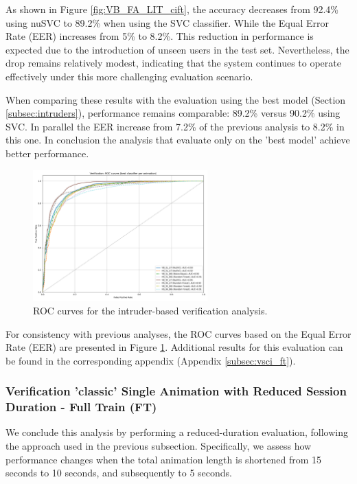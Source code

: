 \documentclass{article}
\begin{document}
As shown in Figure \ref{fig:VB_FA_LIT_cift}, the accuracy decreases from 92.4\% using nuSVC to 89.2\% when using the SVC classifier.
While the Equal Error Rate (EER) increases from 5\% to 8.2\%. 
This reduction in performance is expected due to the introduction of unseen users in the test set. 
Nevertheless, the drop remains relatively modest, indicating that the system continues to operate effectively under this more challenging evaluation scenario.

When comparing these results with the evaluation using the best model (Section \ref{subsec:intruders}), performance remains comparable: 89.2\% versus 90.2\% using SVC. 
In parallel the EER increase from 7.2\% of the previous analysis to 8.2\% in this one.
In conclusion the analysis that evaluate only on the 'best model' achieve better performance.

\begin{figure}[ht]
\centering
\includegraphics[width=0.6\textwidth]{Images/Results/Classic_procedure/Verification_intruders/ft/Verification_single_intruders_roc_two_ft.png}
\caption{ROC curves for the intruder-based verification analysis.}
\label{fig:roc_cift}
\end{figure}

For consistency with previous analyses, the ROC curves based on the Equal Error Rate (EER) are presented in Figure \ref{fig:roc_cift}. 
Additional results for this evaluation can be found in the corresponding appendix (Appendix \ref{subsec:vsci_ft}).
\FloatBarrier

\subsubsection{Verification 'classic' Single Animation with Reduced Session Duration - Full Train (FT)}

We conclude this analysis by performing a reduced-duration evaluation, following the approach used in the previous subsection. 
Specifically, we assess how performance changes when the total animation length is shortened from 15 seconds to 10 seconds, and subsequently to 5 seconds.
\end{document}
